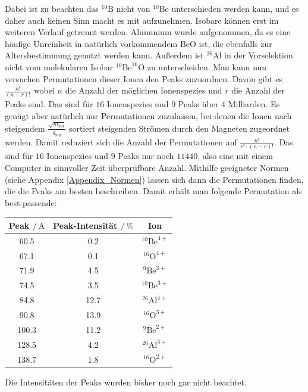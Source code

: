 Dabei ist zu beachten das $^{10}\text{B}$ nicht von $^{10}\text{Be}$ unterschieden werden kann, und es daher auch keinen Sinn macht es mit aufzunehmen.
Isobare können erst im weiteren Verlauf getrennt werden.
Aluminium wurde aufgenommen, da es eine häufige Unreinheit in natürlich vorkommendem BeO ist, die ebenfalls zur Altersbestimmung genutzt werden kann.
Außerdem ist $^{26}\text{Al}$ in der Vorselektion nicht vom molekularen Isobar $^{10}\text{Be}^{16}\text{O}$ zu unterscheiden.
Man kann nun versuchen Permutationen dieser Ionen den Peaks zuzuordnen.
Davon gibt es $\frac{n!}{(n-r)!}$ wobei $n$ die Anzahl der möglichen Ionenspezies und $r$ die Anzahl der Peaks sind.
Das sind für $16$ Ionenspezies und $9$ Peaks über $4$ Milliarden.
Es genügt aber natürlich nur Permutationen zuzulassen, bei denen die Ionen nach steigendem $\frac{\sqrt{m_{\text{ion}}}}{q_{\text{ion}}}$ sortiert steigenden Strömen durch den Magneten zugeordnet werden.
Damit reduziert sich die Anzahl der Permutationen auf $\frac{n!}{r! \cdot (n-r)!}$.
Das sind für $16$ Ionenspezies und $9$ Peaks nur noch $11440$, also eine mit einem Computer in sinnvoller Zeit überprüfbare Anzahl.
Mithilfe geeigneter Normen (siehe Appendix \ref{Appendix_Normen}) lassen sich dann die Permutationen finden, die die Peaks am besten beschreiben.
Damit erhält man folgende Permutation als best-passende:
\begin{center}
  \begin{tabular}{|c|c|c|}
    \hline
    Peak $/\ \si{\ampere}$ & Peak-Intensität $/\ \%$ & Ion \\
    \hline
    \num{60.5} & \num{0.2} & $^{10}\text{Be}^{4+}$ \\
    \hline
    \num{67.1} & \num{0.1} & $^{16}\text{O}^{4+}$ \\
    \hline
    \num{71.9} & \num{4.5} & $^{9}\text{Be}^{3+}$ \\
    \hline
    \num{74.5} & \num{3.5} & $^{10}\text{Be}^{3+}$ \\
    \hline
    \num{84.8} & \num{12.7} & $^{26}\text{Al}^{4+}$ \\
    \hline
    \num{90.8} & \num{13.9} & $^{16}\text{O}^{3+}$ \\
    \hline
    \num{100.3} & \num{11.2} & $^{9}\text{Be}^{2+}$ \\
    \hline
    \num{128.5} & \num{4.2} & $^{26}\text{Al}^{3+}$ \\
    \hline
    \num{138.7} & \num{1.8} & $^{16}\text{O}^{2+}$ \\
    \hline
  \end{tabular}
  \label{Auswertung_tab_Teilchenspezies_BeO_HE}
\end{center}
Die Intensitäten der Peaks wurden bisher noch gar nicht beachtet.
